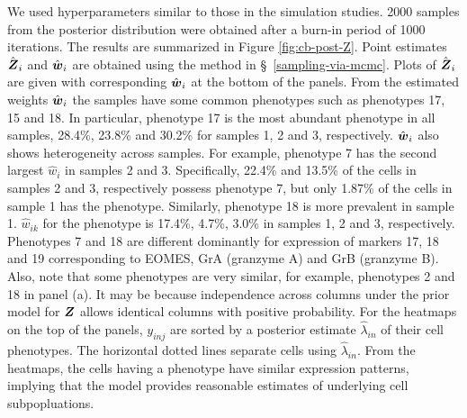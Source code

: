 \documentclass[12pt,]{article}
\newcommand{\bZ}{\mbox{\boldmath $Z$}}
\newcommand{\bw}{\mbox{\boldmath $w$}}
\begin{document}
We used hyperparameters similar to those in the simulation studies.
%
2000 samples from the posterior distribution were obtained after a burn-in
period of 1000 iterations. The results are summarized in Figure
\ref{fig:cb-post-Z}.  Point estimates $\hat{\bZ}_i$ and $\hat{\bw}_i$ are
obtained using the method in \S~\ref{sampling-via-mcmc}.
Plots of $\hat{\bZ}_i$ are given with corresponding $\hat{\bw}_i$ at the bottom
of the panels.  From the estimated weights $\hat{\bw}_i$ the samples have some
common phenotypes such as phenotypes 17, 15 and 18.  In particular, phenotype
17 is the most abundant phenotype in all samples, 28.4\%, 23.8\% and 30.2\% for
samples 1, 2 and 3, respectively.  $\hat{\bw}_i$ also shows heterogeneity
across samples.  For example, phenotype 7 has the second largest $\hat{w}_i$ in
samples 2 and 3. Specifically, 22.4\% and 13.5\% of the cells in samples 2 and
3, respectively possess phenotype 7, but only
1.87\%
%
of the cells in sample 1 has the phenotype.  Similarly, phenotype 18 is more
prevalent in sample 1.  $\hat{w}_{ik}$ for the phenotype is 17.4\%, 4.7\%,
3.0\% in samples 1, 2 and 3, respectively.  Phenotypes 7 and 18 are different
dominantly for expression of markers 17, 18 and 19 corresponding to EOMES, GrA
(granzyme A) and GrB (granzyme B).  Also, note that some phenotypes are very
similar, for example, phenotypes 2 and 18 in panel (a).  It may be because
independence across columns under the prior model for $\bZ$ allows identical
columns with positive probability.  For the heatmaps on the top of the panels,
$y_{inj}$ are sorted by a posterior estimate $\hat{\lambda}_{in}$ of their cell
phenotypes. The horizontal dotted lines separate cells using
$\hat{\lambda}_{in}$.  From the heatmaps, the cells having a phenotype have
similar expression patterns, implying that the model provides reasonable
estimates of underlying cell subpopluations.

\end{document}
